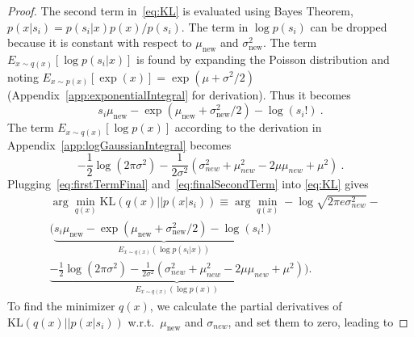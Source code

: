 \begin{proof}
The second term in~\eqref{eq:KL} is evaluated using
Bayes Theorem,
$p(x|s_i)=p(s_i|x)p(x)/p(s_i)$.
The term in $\log p(s_i)$ can be dropped because it is constant
with respect to $\mu_{\text{new}}$ and $\sigma_{\text{new}}^2$.
The term $E_{x\sim q(x)} [\log p(s_i|x)]$ is found by expanding the
Poisson distribution and noting $E_{x\sim p(x)}[\exp(x)] = \exp(\mu+\sigma^2/2)$ (Appendix~\ref{app:exponentialIntegral} for derivation).
Thus it becomes
\begin{equation}\label{eq:firstTermFinal}
  s_i \mu_{\text{new}} - \exp(\mu_{\text{new}} + \sigma_{\text{new}}^2/2) - \log(s_i!)~.
\end{equation}
\noindent
The term $E_{x\sim q(x)}[\log p(x)]$
according to the derivation in Appendix~\ref{app:logGaussianIntegral} becomes
\begin{equation}\label{eq:finalSecondTerm}
     -\frac{1}{2}\log(2\pi\sigma^2) -
         \frac{1}{2\sigma^2}\left(\sigma_{new}^2 + \mu_{new}^2-2\mu\mu_{new} + \mu^2 \right)~.
\end{equation}
Plugging~\eqref{eq:firstTermFinal} and~\eqref{eq:finalSecondTerm} into
\eqref{eq:KL} gives
\begin{align*}
    &\arg\min_{q(x)}\text{KL}\left(q(x)|| p(x|s_i)\right) \equiv \arg\min_{q(x)}-\log\sqrt{2\pi e \sigma_{new}^2} - \nonumber \\
    &\bigg( \underbrace{s_i \mu_{\text{new}} - \exp(\mu_{\text{new}} + \sigma_{\text{new}}^2/2) - \log(s_i!)}_{E_{x\sim q(x)} (\log p(s_i|x))} \nonumber \\
    & \underbrace{-\frac{1}{2}\log(2\pi\sigma^2) - \frac{1}{2\sigma^2}\left(\sigma_{new}^2 + \mu_{new}^2-2\mu\mu_{new} + \mu^2 \right)}_{E_{x\sim q(x)}(\log p(x))} \bigg).
\end{align*}
To find the minimizer $q(x)$, we calculate the partial derivatives of
$\text{KL}\left(q(x)|| p(x|s_i)\right)$ w.r.t.\
$\mu_{\text{new}}$ and $\sigma_{new}$, and set them to zero, leading to%

\end{proof}
